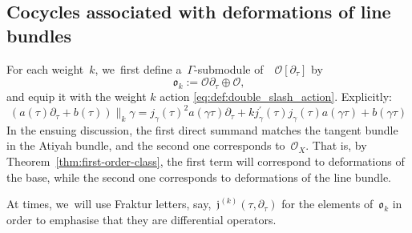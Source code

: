 \documentclass[JEP,XML,SOM,Unicode,published]{cedram}
\theoremstyle{plain}
\theoremstyle{definition}
\newcommand{\tx}{\text}
\newcommand{\nbd}{\nobreakdash-\hspace{0pt}}
\newcommand{\cO}{\ensuremath{\mathcal{O}}}
\newcommand{\frakj}{\ensuremath{\mathfrak{j}}}
\newcommand{\frako}{\ensuremath{\mathfrak{o}}}
\newcommand{\defeq}{:=}
\let\Ga\Gamma
\let\ga\gamma
\begin{document}
\subsection{Cocycles associated with deformations of line bundles}
\label{ssec:first_order_cocycles_line_bundle}

For each weight~$k$, we~first define a~$\Ga$\nbd{}submodule of~~$\cO[\partial_\tau]$ by
\begin{equation}
\label{eq:def:frako}
\frako_k
\defeq
\cO\partial_\tau \oplus \cO
\tx{,}
\end{equation}
and equip it with the weight $k$ action \ref{eq:def:double_slash_action}. Explicitly:
\[
\left(a(\tau)\partial_\tau+b(\tau)\right)\big\|_k \ga = j_\ga(\tau)^2a(\ga\tau)\partial_\tau + kj_\ga^\prime(\tau)j_\ga(\tau)a(\ga\tau)+b(\ga\tau)\]
In the ensuing discussion, the first direct summand matches the tangent bundle in the Atiyah bundle, and the second one corresponds to~$\cO_X$. That is, by Theorem~\ref{thm:first-order-class}, the first term will correspond to deformations of the base, while the second one corresponds to deformations of the line bundle.

At times, we~will use Fraktur letters, say,~$\frakj^{(k)}(\tau, \partial_\tau)$ for the elements of~$\frako_k$ in order to emphasise that they are differential operators.
\end{document}

